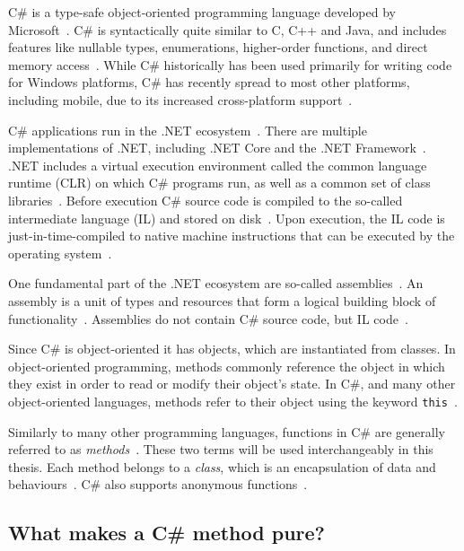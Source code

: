 \documentclass[a4paper,12pt]{article}
\begin{document}
C\# is a type-safe object-oriented programming language developed by Microsoft~\cite{albahari2003nutshell}. C\# is syntactically quite similar to C, C++ and Java, and includes features like nullable types, enumerations, higher-order functions, and direct memory access~\cite{intro-to-Csharp}. While C\# historically has been used primarily for writing code for Windows platforms, C\# has recently spread to most other platforms, including mobile, due to its increased cross-platform support~\cite{albahari2003nutshell}.

C\# applications run in the .NET ecosystem~\cite{intro-to-Csharp}. There are multiple implementations of .NET, including .NET Core and the .NET Framework~\cite{intro-to-Csharp}. .NET includes a virtual execution environment called the common language runtime (CLR) on which C\# programs run, as well as a common set of class libraries~\cite{albahari2003nutshell}. Before execution C\# source code is compiled to the so-called intermediate language (IL) and stored on disk~\cite{intro-to-Csharp}. Upon execution, the IL code is just-in-time-compiled to native machine instructions that can be executed by the operating system~\cite{intro-to-Csharp}.

One fundamental part of the .NET ecosystem are so-called assemblies~\cite{assemblies}. An assembly is a unit of types and resources that form a logical building block of functionality~\cite{assemblies}. Assemblies do not contain C\# source code, but IL code~\cite{assemblies-overview}.

Since C\# is object-oriented it has objects, which are instantiated from classes. In object-oriented programming, methods commonly reference the object in which they exist in order to read or modify their object's state. In C\#, and many other object-oriented languages, methods refer to their object using the keyword \texttt{this}~\cite{microsoft-this}.

Similarly to many other programming languages, functions in C\# are generally referred to as \textit{methods}~\cite{albahari2003nutshell}. These two terms will be used interchangeably in this thesis. Each method belongs to a \textit{class}, which is an encapsulation of data and behaviours~\cite{albahari2003nutshell}. C\# also supports anonymous functions~\cite{albahari2003nutshell}.

\subsection{What makes a C\# method pure?} \label{sub:What makes a Cs program functional?}
\end{document}
